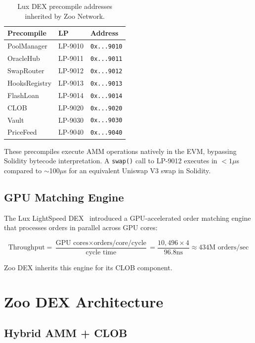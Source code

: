 \documentclass[11pt,letterpaper]{article}
\begin{document}
\begin{table}[t]
\centering
\begin{tabular}{lll}
\toprule
\textbf{Precompile} & \textbf{LP} & \textbf{Address} \\
\midrule
PoolManager & LP-9010 & \texttt{0x...9010} \\
OracleHub & LP-9011 & \texttt{0x...9011} \\
SwapRouter & LP-9012 & \texttt{0x...9012} \\
HooksRegistry & LP-9013 & \texttt{0x...9013} \\
FlashLoan & LP-9014 & \texttt{0x...9014} \\
CLOB & LP-9020 & \texttt{0x...9020} \\
Vault & LP-9030 & \texttt{0x...9030} \\
PriceFeed & LP-9040 & \texttt{0x...9040} \\
\bottomrule
\end{tabular}
\caption{Lux DEX precompile addresses inherited by Zoo Network.}
\label{tab:precompiles}
\end{table}

These precompiles execute AMM operations natively in the EVM, bypassing Solidity bytecode interpretation. A \texttt{swap()} call to LP-9012 executes in $< 1\mu$s compared to $\sim$100$\mu$s for an equivalent Uniswap V3 swap in Solidity.

\subsection{GPU Matching Engine}

The Lux LightSpeed DEX~\cite{lux-lightspeed-dex} introduced a GPU-accelerated order matching engine that processes orders in parallel across GPU cores:

\begin{equation}
\text{Throughput} = \frac{\text{GPU cores} \times \text{orders/core/cycle}}{\text{cycle time}} = \frac{10,496 \times 4}{96.8\text{ns}} \approx 434\text{M orders/sec}
\end{equation}

Zoo DEX inherits this engine for its CLOB component.

\section{Zoo DEX Architecture}
\label{sec:architecture}

\subsection{Hybrid AMM + CLOB}
\end{document}
